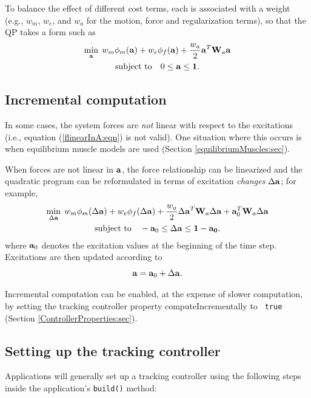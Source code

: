 To balance the effect of different cost terms, each is associated with
a weight (e.g., $w_m$, $w_e$, and $w_a$ for the motion, force and
regularization terms), so that the QP takes a form such as
%
\begin{gather}
\min_{{\bf a}} \; w_m \phi_m({\bf a}) + w_e \phi_f ({\bf a}) + \frac{w_a}{2} {\bf a}^T {\bf W}_a {\bf a} \notag \\
\text{subject to} \quad 0 \le {\bf a} \le {\bf 1}.
\label{fullQP:eqn}
\end{gather}
%

\subsection{Incremental computation}
\label{IncrementalComputation:sec}

In some cases, the system forces are {\it not} linear with respect to the
excitations (i.e., equation (\ref{flinearInA:eqn}) is not valid). One
situation where this occurs is when equilibrium muscle models are used
(Section \ref{equilibriumMuscles:sec}).

When forces are not linear in ${\bf a}$, the force relationship can be linearized
and the quadratic program can be reformulated in terms of excitation {\it
changes} $\Delta {\bf a}$; for example,
%
\begin{gather}
\min_{\Delta{\bf a}} \; w_m \phi_m(\Delta{\bf a}) + w_e \phi_f (\Delta{\bf a}) + 
\frac{w_a}{2} \Delta{\bf a}^T {\bf W}_a \Delta{\bf a} + {\bf a}_0^T {\bf W}_a \Delta{\bf a} \notag \\
\text{subject to} \quad -{\bf a}_0 \le \Delta{\bf a} \le {\bf 1-{\bf a}_0}.
\label{incrementalQP:eqn}
\end{gather}
%
where ${\bf a}_0$ denotes the excitation values at the beginning of
the time step. Excitations are then updated
according to 
%
\begin{equation*}
{\bf a} = {\bf a}_0 + \Delta {\bf a}.
\end{equation*}
%

Incremental computation can be enabled, at the expense of slower computation,
by setting the tracking controller property {\sf computeIncrementally} to {\tt
true} (Section \ref{ControllerProperties:sec}).

\subsection{Setting up the tracking controller}
\label{SettingUpController:sec}

Applications will generally set up a tracking controller using the following
steps inside the application's {\tt build()} method:

